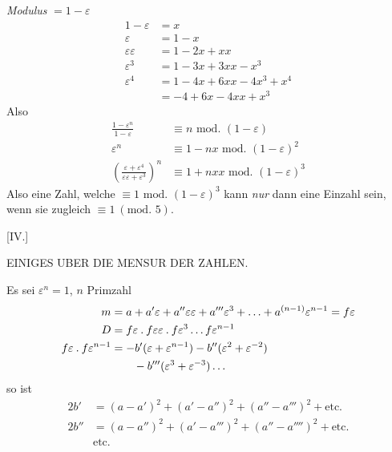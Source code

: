 \emph{Modulus} $=1-\varepsilon$
\[
\begin{aligned}
1-\varepsilon&=x\\
\varepsilon&=1-x\\
\varepsilon\varepsilon&=1-2x+xx\\
\varepsilon^3&=1-3x+3xx-x^3\\
\varepsilon^4&=1-4x+6xx-4x^3+x^4\\
&=-4+6x-4xx+x^3
\end{aligned}
\]
Also
\[
\begin{aligned}
\frac{1-\varepsilon^n}{1-\varepsilon}&\equiv n\text{ mod. }(1-\varepsilon)\\
\varepsilon^n&\equiv1-nx\text{ mod. }(1-\varepsilon)^2\\
\left(\frac{\varepsilon+\varepsilon^4}{\varepsilon\varepsilon+\varepsilon^3}\right)^n&\equiv1+nxx\text{ mod. }(1-\varepsilon)^3
\end{aligned}
\]
Also eine Zahl, welche $\equiv1\text{ mod. }(1-\varepsilon)^3$ kann \emph{nur} dann eine Einzahl sein, wenn sie zugleich $\equiv1\ (\text{mod. }5)$.

%
\begin{center}[IV.]\par\medskip
EINIGES UBER DIE MENSUR DER ZAHLEN.
\end{center}
Es sei $\varepsilon^n=1$, $n$ Primzahl
\[
\begin{aligned}
m&=a+a'\varepsilon+a''\varepsilon\varepsilon+a'''\varepsilon^3+\ldots+a^{(n-1)}\varepsilon^{n-1}=f\varepsilon\\
D&=f\varepsilon\mathbin{.} f\varepsilon\varepsilon\mathbin{.} f\varepsilon^3\ldots f\varepsilon^{n-1}\\
f\varepsilon\mathbin{.} f\varepsilon^{n-1}&=-b'(\varepsilon+\varepsilon^{n-1})-b''(\varepsilon^2+\varepsilon^{-2})\\
&\qquad-b'''(\varepsilon^3+\varepsilon^{-3})\ldots
\end{aligned}
\]
so ist
\[
\begin{aligned}
2b'&=(a-a')^2+(a'-a'')^2+(a''-a''')^2+\text{etc.}\\
2b''&=(a-a'')^2+(a'-a''')^2+(a''-a'''')^2+\text{etc.}\\
&\text{etc.}
\end{aligned}
\]

